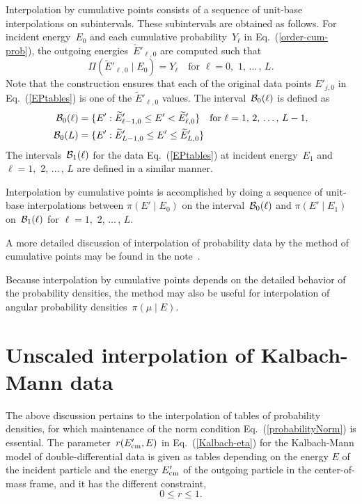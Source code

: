 Interpolation by cumulative points consists of a sequence of unit-base 
interpolations on subintervals.  These subintervals are obtained as
follows.  For incident energy~$E_0$ and each cumulative probability~$Y_\ell$
in Eq.~(\ref{order-cum-prob}), the outgoing 
energies~$\widetilde E'_{\ell,0}$ are computed such that
$$
  \Pi( \widetilde E'_{\ell,0} \mid E_0) = Y_\ell \quad
  \text{for $\ell = 0,$ 1, $\ldots\,$, $L$}.
$$
Note that the construction ensures that each of the original
data points $E'_{j,0}$ in Eq.~(\ref{EPtables}) is one of the
$\widetilde E'_{\ell,0}$ values.  The interval~${\cal B}_0(\ell)$ is defined as
\begin{equation}
 \begin{split}
  {\cal B}_0(\ell) &= \{ E': \widetilde E'_{\ell-1,0} \le E' < \widetilde E'_{\ell,0} \}
  \quad \text{for $\ell = 1,$ 2, $\ldots\,$, $L-1$}, \\
  {\cal B}_0(L) &= \{ E': \widetilde E'_{L-1,0} \le E' \le \widetilde E'_{L,0} \}
 \end{split}
 \label{def-B0-ell}
\end{equation}
The intervals~${\cal B}_1(\ell)$ for the data Eq.~(\ref{EPtables}) at
incident energy~$E_1$ and $\ell = 1,$ 2, $\ldots\,$, $L$ are defined
in a similar manner.

Interpolation by cumulative points is accomplished by doing
a sequence of unit-base interpolations between $\pi( E' \mid E_0)$
on the interval~${\cal B}_0(\ell)$ and $\pi( E' \mid E_1)$ on~${\cal B}_1(\ell)$
for $\ell = 1,$ 2, $\ldots\,$, $L$.

A more detailed discussion of interpolation of probability data by
the method of cumulative points may be found in the note~\cite{interpolation}.

Because interpolation by cumulative points depends on the
detailed behavior of the probability densities, the method may also be useful
for interpolation of angular probability densities~$\pi( \mu \mid E)$.

\section{Unscaled interpolation of Kalbach-Mann data}\label{Sec:Kalbach-r-interp}
The above discussion pertains to the interpolation of tables of probability densities,
for which maintenance of the norm condition Eq.~(\ref{probabilityNorm})
is essential.  The parameter~$r(E_{\text{cm}}', E)$ in Eq.~(\ref{Kalbach-eta}) for the
Kalbach-Mann model of double-differential data is given as tables
depending on the energy $E$ of the incident particle and the energy $E_{\text{cm}}'$ of
the outgoing particle in the center-of-mass frame, and it has the different
constraint,
\begin{equation}
  0 \le r \le 1.
 \label{Kalbach-r-constraint}
\end{equation}

